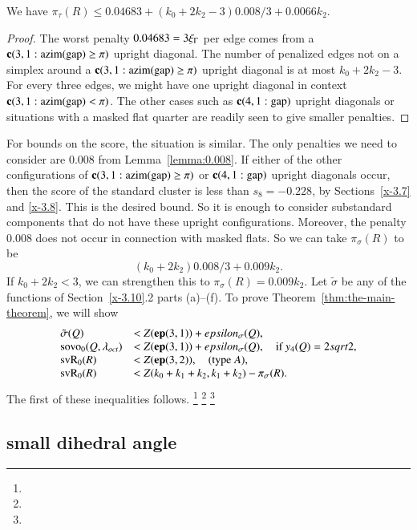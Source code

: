 \begin{lemma}
We have
    $\pi_\tau(R)\le 0.04683 + (k_0+2k_2-3)0.008/3 +0.0066k_2$.
\end{lemma}

\begin{proof}
The worst penalty $0.04683=3\xi_\Gamma$ per edge comes from a
${\operatorname{\bf c}}{(3,1: {\operatorname{azim}}({\operatorname{gap}}) \ge \pi)}$ upright diagonal. The number of penalized edges not on
a simplex around a ${\operatorname{\bf c}}{(3,1: {\operatorname{azim}}({\operatorname{gap}}) \ge \pi)}$ upright diagonal is at most
$k_0+2k_2-3$. For every three edges, we might have one
 upright diagonal in context ${\operatorname{\bf c}}{(3,1: {\operatorname{azim}}({\operatorname{gap}}) <\pi)}$. The other cases such as
${\operatorname{\bf c}}{(4,1:{\operatorname{gap}})}$ upright diagonals or situations with a masked flat
quarter are readily seen to give smaller penalties.
\end{proof}

For bounds on the score, the situation is similar.  The only
penalties we need to consider are $0.008$ from
Lemma~\ref{lemma:0.008}. If either of the other configurations of
${\operatorname{\bf c}}{(3,1: {\operatorname{azim}}({\operatorname{gap}}) \ge \pi)}$ or ${\operatorname{\bf c}}{(4,1:{\operatorname{gap}})}$ upright diagonals occur, then the score
of the standard cluster is less than $s_8=-0.228$, by
Sections~\ref{x-3.7} and \ref{x-3.8}. This is the desired bound.
So it is enough to consider substandard components that do not have these
upright configurations. Moreover, the penalty $0.008$ does not
occur in connection with masked flats. So we can take
$\pi_\sigma(R)$ to be
    $$(k_0+2k_2)0.008/3 + 0.009 k_2.$$
If $k_0+2k_2<3$, we can strengthen this to
    $\pi_\sigma(R)=0.009 k_2$.
Let $\tilde\sigma$ be any of the functions of Section~\ref{x-3.10}.2
parts (a)--(f). To prove Theorem~\ref{thm:the-main-theorem}, we will
show
    \begin{equation}
    \begin{array}{lll}
    \tilde\sigma(Q)&< Z({\operatorname{\bf ep}}{(3,1)})+epsilon_\sigma(Q),\\
    {\operatorname{sovo}}_0(Q,\lambda_{oct})
    &< Z({\operatorname{\bf ep}}{(3,1)})+epsilon_\sigma(Q),\quad\text{if }y_4(Q)=2sqrt2,\\
    {\operatorname{svR}}_0(R)&< Z({\operatorname{\bf ep}}{(3,2)}),\quad\text{(type $A$)},\\
    {\operatorname{svR}}_0(R) &< Z(k_0+k_1+k_2,k_1+k_2) - \pi_\sigma(R).
    \label{eqn:sigma<Z(n,k)}
    \end{array}
    \end{equation}
The first of these inequalities follows.%
\footnote{} %
\footnote{} %
\footnote{} %


\subsection{small dihedral angle} %
\label{sec:small-dih}

